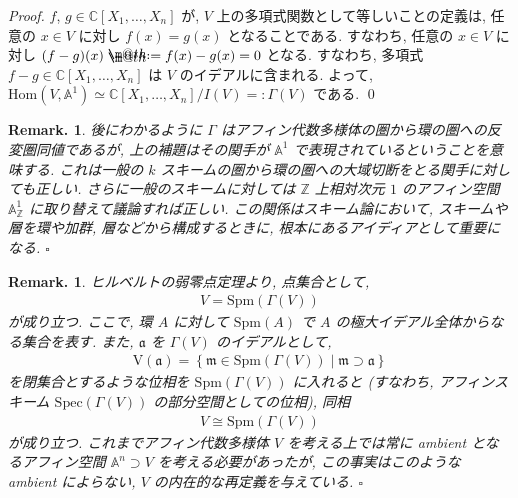 \documentclass[openany, a4paper, oneside]{jsbook}
\makeatletter
\newcommand*{\defeq}{\mathrel{\rlap{%
\raisebox{0.3ex}{$\m@th\cdot$}}%
\raisebox{-0.3ex}{$\m@th\cdot$}}%
=}
\theoremstyle{break}
\theoremstyle{breakdefn}
\newtheorem{rem}[thm]{Remark.}
\newcommand{\rbk}[1]{\left (#1\right)}
\newcommand{\relmiddle}[1]{\mathrel{}\middle#1\mathrel{}}
\newcommand{\set}[2]{\left\{#1 \relmiddle| #2\right\}}
\newcommand{\fin}{\hfill $\square$ \par}
\newcommand{\homo}{\mathrm{Hom}}
\makeatother
\begin{document}
\begin{proof}
$f$, $g \in \mathbb{C}[X_1,\dots,X_n]$ が,
$V$ 上の多項式関数として等しいことの定義は, 任意の $x \in V$ に対し $f (x) =g (x)$ となることである.
すなわち, 任意の $x \in V$ に対し $(f-g) (x) \defeq  f (x) -g (x) = 0$ となる.
すなわち, 多項式 $f-g \in \mathbb{C}[X_1,\dots,X_n]$ は $V$ のイデアルに含まれる.
よって,  $\homo (V,\mathbb{A}^1) \simeq \mathbb{C}[X_1,\dots,X_n]/I (V) =: \Gamma (V)$ である. \qed
\end{proof}
\begin{rem}
後にわかるように $\Gamma$ はアフィン代数多様体の圏から環の圏への反変圏同値であるが,
上の補題はその関手が $\mathbb{A}^1$ で表現されているということを意味する.
これは一般の $k$ スキームの圏から環の圏への大域切断をとる関手に対しても正しい.
さらに一般のスキームに対しては $\mathbb{Z}$ 上相対次元 $1$ のアフィン空間 $\mathbb{A}_{\mathbb{Z}}^1$ に取り替えて議論すれば正しい.
この関係はスキーム論において, スキームや層を環や加群, 層などから構成するときに, 根本にあるアイディアとして重要になる. \fin
\end{rem}
\begin{rem}\label{waheyhey-algebraic-geometry-guidance6}
ヒルベルトの弱零点定理より, 点集合として,
\begin{align}
 V
 =
 \mathrm{Spm} \rbk{\Gamma ( V )}
\end{align}
が成り立つ.
ここで, 環 $A$ に対して $\mathrm{Spm}(A)$ で $A$ の極大イデアル全体からなる集合を表す.
また, $\mathfrak{a}$ を $\Gamma ( V )$ のイデアルとして,
\begin{align}
 \mathrm{V} ( \mathfrak{a} )
 =
 \set{\mathfrak{m} \in \mathrm{Spm} \rbk{\Gamma ( V )}}{\mathfrak{m} \supset \mathfrak{a}}
\end{align}
を閉集合とするような位相を $\mathrm{Spm} \left ( \Gamma ( V ) \right)$ に入れると
(すなわち, アフィンスキーム $\mathrm{Spec} \left ( \Gamma ( V ) \right)$ の部分空間としての位相),
同相
\begin{align}
 V
 \cong
 \mathrm{Spm} \left ( \Gamma ( V ) \right)
\end{align}
が成り立つ.
これまでアフィン代数多様体 $V$ を考える上では常に ambient となるアフィン空間 $\mathbb{A}^n \supset V$ を考える必要があったが,
この事実はこのような ambient によらない, $V$ の内在的な再定義を与えている. \fin
\end{rem}
\end{document}
